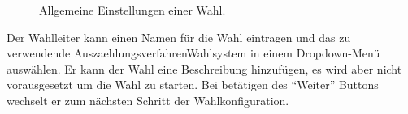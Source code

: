 \documentclass[parskip=full,11pt,twoside]{scrartcl}
\begin{document}
\begin{figure}[H]
	\caption{\label{fig:wlltr-general}
		Allgemeine Einstellungen einer Wahl.
	}
\end{figure}
Der \gls{Wahlleiter} kann einen Namen für die \gls{Wahl} eintragen und das zu verwendende \gls{Auszaehlungsverfahren}{Wahlsystem} in einem Dropdown-Menü auswählen.
Er kann der \gls{Wahl} eine Beschreibung hinzufügen, es wird aber nicht vorausgesetzt um die Wahl zu starten.
Bei betätigen des \enquote{Weiter} Buttons wechselt er zum nächsten Schritt der Wahlkonfiguration.
\end{document}
